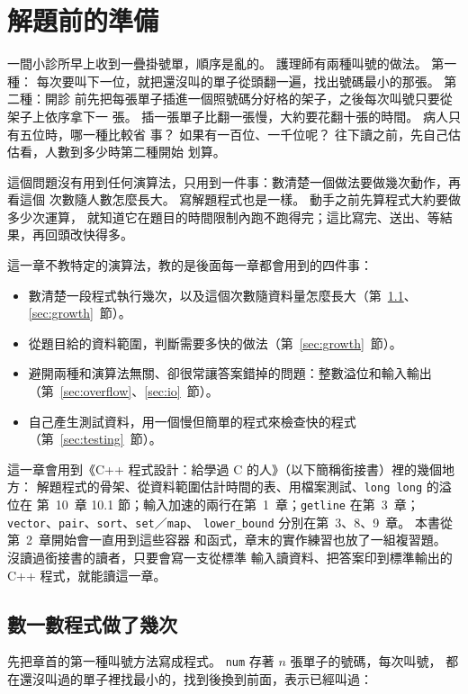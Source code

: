 \chapter{解題前的準備}
\label{ch:prep}

一間小診所早上收到一疊掛號單，順序是亂的。 護理師有兩種叫號的做法。 第一種：
每次要叫下一位，就把還沒叫的單子從頭翻一遍，找出號碼最小的那張。 第二種：開診
前先把每張單子插進一個照號碼分好格的架子，之後每次叫號只要從架子上依序拿下一
張。 插一張單子比翻一張慢，大約要花翻十張的時間。 病人只有五位時，哪一種比較省
事？ 如果有一百位、一千位呢？ 往下讀之前，先自己估估看，人數到多少時第二種開始
划算。

這個問題沒有用到任何演算法，只用到一件事：數清楚一個做法要做幾次動作，再看這個
次數隨人數怎麼長大。 寫解題程式也是一樣。 動手之前先算程式大約要做多少次運算，
就知道它在題目的時間限制內跑不跑得完；這比寫完、送出、等結果，再回頭改快得多。

這一章不教特定的演算法，教的是後面每一章都會用到的四件事：

\begin{itemize}
\item 數清楚一段程式執行幾次，以及這個次數隨資料量怎麼長大（第~\ref{sec:count-loops}、\ref{sec:growth}~節）。
\item 從題目給的資料範圍，判斷需要多快的做法（第~\ref{sec:growth}~節）。
\item 避開兩種和演算法無關、卻很常讓答案錯掉的問題：整數溢位和輸入輸出（第~\ref{sec:overflow}、\ref{sec:io}~節）。
\item 自己產生測試資料，用一個慢但簡單的程式來檢查快的程式（第~\ref{sec:testing}~節）。
\end{itemize}

這一章會用到《C++ 程式設計：給學過 C 的人》（以下簡稱銜接書）裡的幾個地方：
解題程式的骨架、從資料範圍估計時間的表、用檔案測試、\texttt{long long} 的溢位在
第~10~章 10.1 節；輸入加速的兩行在第~1~章；\texttt{getline} 在第~3~章；
\texttt{vector}、\texttt{pair}、\texttt{sort}、\texttt{set}／\texttt{map}、
\texttt{lower\_bound} 分別在第~3、8、9~章。 本書從第~2~章開始會一直用到這些容器
和函式，章末的實作練習也放了一組複習題。 沒讀過銜接書的讀者，只要會寫一支從標準
輸入讀資料、把答案印到標準輸出的 C++ 程式，就能讀這一章。

\section{數一數程式做了幾次}
\label{sec:count-loops}

先把章首的第一種叫號方法寫成程式。 \texttt{num} 存著 $n$ 張單子的號碼，每次叫號，
都在還沒叫過的單子裡找最小的，找到後換到前面，表示已經叫過：

